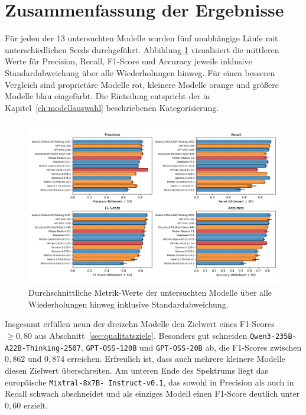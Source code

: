 \section{Zusammenfassung der Ergebnisse}\label{sec:ueberblick}

Für jeden der 13 untersuchten Modelle wurden fünf unabhängige Läufe mit unterschiedlichen Seeds durchgeführt. Abbildung \ref{fig:results-evaluation-metrics-comparison} visualisiert die mittleren Werte für Precision, Recall, F1-Score und Accuracy jeweils inklusive Standardabweichung über alle Wiederholungen hinweg. Für einen besseren Vergleich sind proprietäre Modelle rot, kleinere Modelle orange und größere Modelle blau eingefärbt. Die Einteilung entspricht der in Kapitel~\ref{ch:modellauswahl} beschriebenen Kategorisierung.

\begin{figure}[htbp]
    \centering
    \includegraphics[width=\textwidth,trim=20 40 20 10]{images/results/evaluation_metrics_comparison}
    \caption{Durchschnittliche Metrik-Werte der untersuchten Modelle über alle Wiederholungen hinweg inklusive Standardabweichung.}
    \label{fig:results-evaluation-metrics-comparison}
\end{figure}

Insgesamt erfüllen neun der dreizehn Modelle den Zielwert eines F1-Scores $\geq 0{,}80$ aus Abschnitt~\ref{sec:qualitatsziele}. Besonders gut schneiden \texttt{Qwen3-235B-A22B-Thinking-2507}, \texttt{GPT-OSS-120B} und \texttt{GPT-OSS-20B} ab, die F1-Scores zwischen $0{,}862$ und $0{,}874$ erreichen. Erfreulich ist, dass auch mehrere kleinere Modelle diesen Zielwert überschreiten. Am unteren Ende des Spektrums liegt das europäische \texttt{Mixtral-8x7B-\linebreak~Instruct-v0.1}, das sowohl in Precision als auch in Recall schwach abschneidet und als einziges Modell einen F1-Score deutlich unter $0{,}60$ erzielt.

